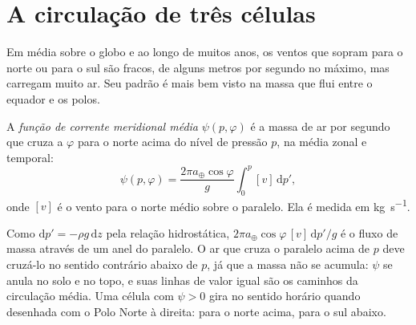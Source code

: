 
\section{A circulação de três células}\label{sec:b1:atmospheric-circulation:cells}

Em média sobre o globo e ao longo de muitos anos, os ventos que sopram para o norte ou para o sul
são fracos, de alguns metros por segundo no máximo, mas carregam muito ar. Seu padrão é mais bem
visto na massa que flui entre o equador e os polos.

\begin{definition}\label{def:b1:atmospheric-circulation:streamfunction}
A \emph{função de corrente meridional média} $\psi(p, \varphi)$ é a massa de ar por segundo que cruza a  $\varphi$ para o norte acima do nível de
pressão $p$, na média zonal e temporal:
\[
  \psi(p, \varphi) = \frac{2\pi a_\oplus\cos\varphi}{g}\int_0^p [v]\,\mathrm dp' ,
\]
onde $[v]$ é o vento para o norte médio sobre o paralelo. Ela é medida em \unit{kg.s^{-1}}.
\end{definition}

Como $\mathrm dp' = -\rho g\,\mathrm dz$ pela relação hidrostática, $2\pi a_\oplus
\cos\varphi\,[v]\,\mathrm dp'/g$ é o fluxo de massa através de um anel do paralelo. O ar que cruza o
paralelo acima de $p$ deve cruzá-lo no sentido contrário abaixo de $p$, já que a massa não se
acumula: $\psi$ se anula no solo e no topo, e suas linhas de valor igual são os caminhos da
circulação média. Uma célula com $\psi > 0$ gira no sentido horário quando desenhada com o Polo Norte
à direita: para o norte acima, para o sul abaixo.


